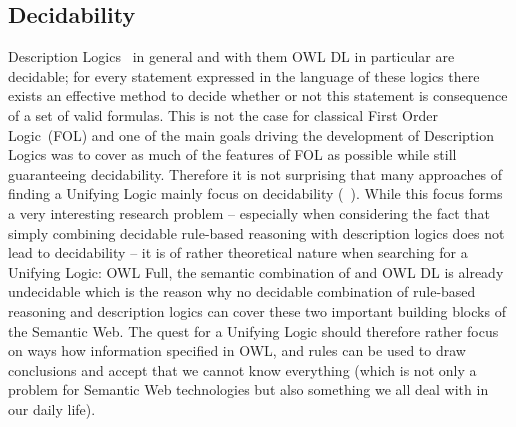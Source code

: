 \subsection{Decidability}
 Description Logics~\cite{dl} in general and with them OWL DL \cite{owldsem} in particular are decidable; for every statement expressed in the language of these logics there
exists an effective method to decide whether or not this statement is consequence of a set of valid formulas. This is not the case for classical 
First Order Logic~(FOL) and one of the main goals driving the development of Description Logics was to cover as much of the features of FOL as possible while still guaranteeing 
decidability. Therefore it is not surprising that many approaches of finding a Unifying Logic mainly focus on decidability (\eg~\cite{unilogic,dllog}). 
While this focus forms a very interesting research problem -- especially when considering the fact that simply combining decidable rule-based reasoning with description logics 
does not lead to decidability \cite{orl} -- it is of rather theoretical nature when searching for a Unifying Logic: OWL Full, 
the semantic combination of \rdf and OWL DL is already undecidable which is the reason why no decidable combination of rule-based reasoning and description logics can cover these 
two important building blocks of the Semantic Web.
%
% 
The quest for a Unifying Logic should therefore rather focus on ways how information specified in OWL, \rdf and rules can be used to draw conclusions
and accept that we cannot know everything (which is not only a problem  for Semantic Web technologies but also something we all deal with in our daily life). 







